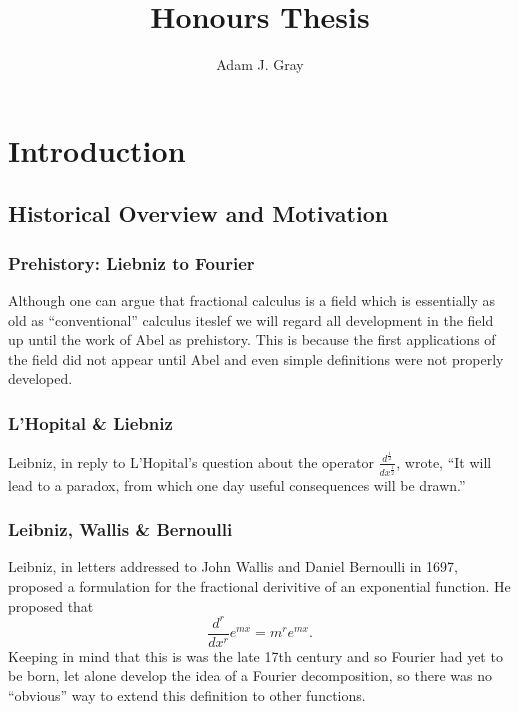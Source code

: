 \documentclass{unswmaths}
\author{Adam J. Gray}
\title{Honours Thesis}
\begin{document}
\unswtitle

\setlength\parindent{0pt}
\setlength{\parskip}{5mm plus4mm minus3mm}

\tableofcontents

\section*{Introduction}
\subsection*{Historical Overview and Motivation}
\subsubsection*{Prehistory: Liebniz to Fourier}
Although one can argue that fractional calculus is a field which is essentially as old as
``conventional'' calculus iteslef we will regard all development in the field up until the
work of Abel as prehistory. This is because the first applications of the field did not appear
until Abel and even simple definitions were not properly developed.

\subsubsection*{L'Hopital \& Liebniz}
Leibniz, in reply to L'Hopital's question about the operator $ \frac{d^\frac{1}{2}}{dx^\frac{1}{2}} $, 
wrote, ``It will lead to a paradox, from which one day useful consequences will be drawn.''
\subsubsection*{Leibniz, Wallis \& Bernoulli}
Leibniz, in letters addressed to John Wallis and Daniel Bernoulli in 1697, proposed a 
formulation for the fractional derivitive of an exponential function.
He proposed that 
$$
    \frac{d^r}{dx^r} e^{mx} = m^r e^{mx}.
$$
Keeping in mind that this is was the late 17th century and so Fourier had yet to 
be born, let alone develop the idea of a Fourier decomposition, so there was
no ``obvious'' way to extend this definition to other functions.
\end{document}
